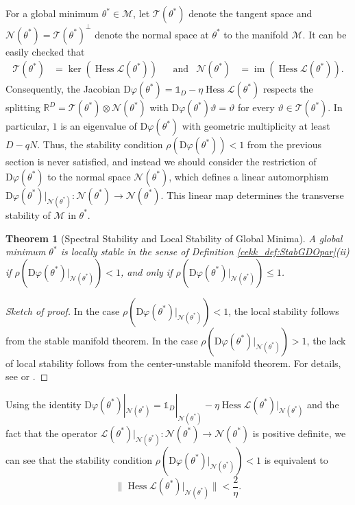 \documentclass[10pt]{article}
\newcommand{\R}{{\mathbb R}}
\def\R{\mathbb{R}}
\newtheorem{theorem}{Theorem}[section]
\begin{document}
For a global minimum $\theta^* \in \mathcal M$, let $\mathcal T(\theta^*)$ denote the tangent space and $\mathcal N(\theta^*) = \mathcal T(\theta^*)^\bot$ denote the normal space at $\theta^*$ to the manifold $\mathcal M$. It can be easily checked that 
\begin{align*}
	\mathcal T(\theta^*) &= \operatorname{ker} (\operatorname{Hess} \mathcal L (\theta^*) )&&\text{and}&\mathcal N(\theta^*) &= \operatorname{im} (\operatorname{Hess} \mathcal L (\theta^*)).
\end{align*}
Consequently, the Jacobian $\mathrm D \varphi(\theta^*) = \mathds 1_D - \eta \operatorname{Hess} \mathcal L (\theta^*)$ respects the splitting $\R^D = \mathcal T(\theta^*) \otimes \mathcal N(\theta^*)$ with $\mathrm D \varphi(\theta^*) \vartheta = \vartheta$ for every $\vartheta \in \mathcal T(\theta^*)$. In particular, $1$ is an eigenvalue of $\mathrm D \varphi(\theta^*)$ with geometric multiplicity at least $D-qN$. Thus, the stability condition $\rho(\mathrm D \varphi(\theta^*)) < 1$ from the previous section is never satisfied, and instead we should consider the restriction of $\mathrm D \varphi(\theta^*)$ to the normal space $\mathcal N(\theta^*)$, which defines a linear automorphism $\mathrm D \varphi(\theta^*)|_{\mathcal N(\theta^*)} : \mathcal N(\theta^*) \to \mathcal N(\theta^*)$. This linear map determines the transverse stability of $\mathcal M$ in $\theta^*$.
\begin{theorem}[Spectral Stability and Local Stability of Global Minima]
	A global minimum $\theta^*$ is locally stable in the sense of Definition \ref{cekk_def:StabGDOpar}(ii) if $\rho(\mathrm D \varphi(\theta^*)|_{\mathcal N(\theta^*)})< 1$, and only if $\rho(\mathrm D \varphi(\theta^*)|_{\mathcal N(\theta^*)})\leq 1$.
\end{theorem}
\begin{proof}[Sketch of proof]
	In the case $\rho(\mathrm D \varphi(\theta^*)|_{\mathcal N(\theta^*)})< 1$, the local stability follows from the stable manifold theorem. In the case $\rho(\mathrm D \varphi(\theta^*)|_{\mathcal N(\theta^*)})> 1$, the lack of local stability follows from the center-unstable manifold theorem. For details, see \cite[Theorem A]{ChemnitzEngel24} or \cite[Section 2]{Ahn22}.
\end{proof}
Using the identity $\mathrm D \varphi(\theta^*)|_{\mathcal N(\theta^*)} = \mathds 1_D|_{\mathcal N(\theta^*)} - \eta \operatorname{Hess} \mathcal L(\theta^*)|_{\mathcal N(\theta^*)}$ and the fact that the operator $\mathcal L(\theta^*)|_{\mathcal N(\theta^*)}: \mathcal N(\theta^*) \to \mathcal N(\theta^*)$ is positive definite, we can see that the stability condition $\rho(\mathrm D \varphi(\theta^*)|_{\mathcal N(\theta^*)})< 1$ is equivalent to 
\begin{equation}\label{cekk_ineq:StabCond2}
	\|\operatorname{Hess} \mathcal L(\theta^*)|_{\mathcal N(\theta^*)}\| < \frac{2}{\eta}.
\end{equation}
\end{document}
